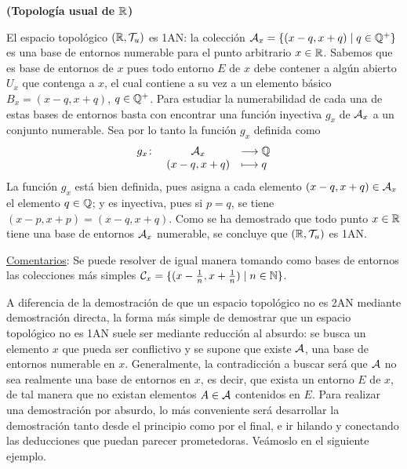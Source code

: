 \begin{ej}
    {\bf (Topología usual de $\mathbb{R}$)} 
    \item El espacio topológico $(\mathbb{R},\mathcal{T}_u)$ es 1AN: la colección $\mathcal{A}_x = \{(x-q,x+q) \mid q \in \mathbb{Q}^+\}$ es una base de entornos numerable para el punto arbitrario $x\in \mathbb{R}$. Sabemos que es base de entornos de $x$ pues todo entorno $E$ de $x$ debe contener a algún abierto $U_x$ que contenga a $x$, el cual contiene a su vez a un elemento básico $B_x = (x-q,x+q)$, $q \in \mathbb{Q}^+$. Para estudiar la numerabilidad de cada una de estas bases de entornos basta con encontrar una función inyectiva $g_x$ de $\mathcal{A}_x$ a un conjunto numerable. Sea por lo tanto la función $g_x$ definida como
    \[
    \begin{array}{rcl}
        g_x \colon & \mathcal{A}_x  & \longrightarrow \mathbb{Q}\\
                & (x-q,x+q) & \longmapsto     q
    \end{array}
    \]
    La función $g_x$ está bien definida, pues asigna a cada elemento $(x-q,x+q)\in\mathcal{A}_x$ el elemento $q\in\mathbb{Q}$; y es inyectiva, pues si $p = q$, se tiene $(x-p,x+p) = (x-q,x+q)$. Como se ha demostrado que todo punto $x\in\mathbb{R}$ tiene una base de entornos $\mathcal{A}_x$ numerable, se concluye que $(\mathbb{R},\mathcal{T}_u)$ es 1AN.

    \medskip

    \underline{Comentarios}:
    Se puede resolver de igual manera tomando como bases de entornos las colecciones más simples $\mathcal{C}_x = \{(x-\frac1n,x+\frac1n) \mid n \in \mathbb{N}\}$.
\end{ej}

\bigskip

A diferencia de la demostración de que un espacio topológico no es 2AN mediante demostración directa, la forma más simple de demostrar que un espacio topológico no es 1AN suele ser mediante reducción al absurdo: se busca un elemento $x$ que pueda ser conflictivo y se supone que existe $\mathcal{A}$, una base de entornos numerable en $x$. Generalmente, la contradicción a buscar será que $\mathcal{A}$ no sea realmente una base de entornos en $x$, es decir, que exista un entorno $E$ de $x$, de tal manera que no existan elementos $A\in\mathcal{A}$ contenidos en $E$. Para realizar una demostración por absurdo, lo más conveniente será desarrollar la demostración tanto desde el principio como por el final, e ir hilando y conectando las deducciones que puedan parecer prometedoras. Veámoslo en el siguiente ejemplo.

